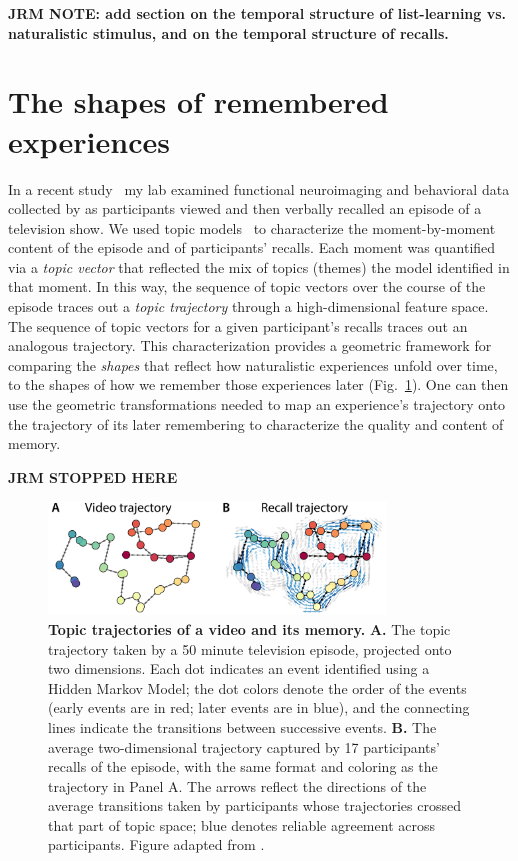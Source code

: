 \documentclass{article}
\begin{document}
\textbf{JRM NOTE: add section on the temporal structure of list-learning vs. naturalistic stimulus, and on the temporal structure of recalls.}

\section*{The shapes of remembered experiences}
In a recent study~\citep{HeusEtal18c} my lab examined functional neuroimaging and behavioral data collected by \cite{ChenEtal17} as participants viewed and then verbally recalled an episode of a television show.  We used topic models~\citep{BleiEtal03} to characterize the moment-by-moment content of the episode and of participants' recalls.  Each moment was quantified via a \textit{topic vector} that reflected the mix of topics (themes) the model identified in that moment.  In this way, the sequence of topic vectors over the course of the episode traces out a \textit{topic trajectory} through a high-dimensional feature space.  The sequence of topic vectors for a given participant's recalls traces out an analogous trajectory.  This characterization provides a geometric framework for comparing the \textit{shapes} that reflect how naturalistic experiences unfold over time, to the shapes of how we remember those experiences later (Fig.~\ref{fig:trajectories}).  One can then use the geometric transformations needed to map an experience's trajectory onto the trajectory of its later remembering to characterize the quality and content of memory.

\textbf{JRM STOPPED HERE}

\begin{figure}[tp]
\centering
\includegraphics[width=0.8\textwidth]{figs/trajectory}
\caption{\textbf{Topic trajectories of a video and its memory.}  \textbf{A.} The topic trajectory taken by a 50 minute television episode, projected onto two dimensions.  Each dot indicates an event identified using a Hidden Markov Model; the dot colors denote the order of the events (early events are in red; later events are in blue), and the connecting lines indicate the transitions between successive events.  \textbf{B.} The average two-dimensional trajectory captured by 17 participants' recalls of the episode, with the same format and coloring as the trajectory in Panel A. The arrows reflect the directions of the average transitions taken by participants whose trajectories crossed that part of topic space; blue denotes reliable agreement across participants.  Figure adapted from \cite{HeusEtal18c}.}
\label{fig:trajectories}
\end{figure}
\end{document}
